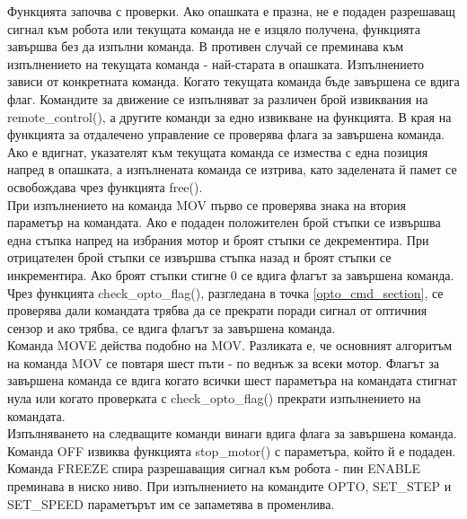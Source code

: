 Функцията започва с проверки. Ако опашката е празна, не е подаден разрешаващ сигнал към робота или текущата команда не е изцяло получена, функцията завършва без да изпълни команда. В противен случай се преминава към изпълнението на текущата команда - най-старата в опашката. Изпълнението зависи от конкретната команда. Когато текущата команда бъде завършена се вдига флаг. Командите за движение се изпълняват за различен брой извиквания на remote\_control(), а другите команди за едно извикване на функцията. В края на функцията за отдалечено управление се проверява флага за завършена команда. Ако е вдигнат, указателят към текущата команда се измества с една позиция напред в опашката, а изпълнената команда се изтрива, като заделената й памет се освобождава чрез функцията free().\\
\indent{}
При изпълнението на команда MOV първо се проверява знака на втория параметър на командата. Ако е подаден положителен брой стъпки се извършва една стъпка напред на избрания мотор и броят стъпки се декрементира. При отрицателен брой стъпки се извършва стъпка назад и броят стъпки се инкрементира. Ако броят стъпки стигне 0 се вдига флагът за завършена команда. Чрез функцията check\_opto\_flag(), разгледана в точка \ref{opto_cmd_section}, се проверява дали командата трябва да се прекрати поради сигнал от оптичния сензор и ако трябва, се вдига флагът за завършена команда.\\
\indent{}
Команда MOVE действа подобно на MOV. Разликата е, че основният алгоритъм на команда MOV се повтаря шест пъти - по веднъж за всеки мотор. Флагът за завършена команда се вдига когато всички шест параметъра на командата стигнат нула или когато проверката с check\_opto\_flag() прекрати изпълнението на командата.\\
\indent{}
Изпълняването на следващите команди винаги вдига флага за завършена команда. Команда OFF извиква функцията stop\_motor() с параметъра, който й е подаден. Команда FREEZE спира разрешаващия сигнал към робота - пин ENABLE преминава в ниско ниво. При изпълнението на командите OPTO, SET\_STEP и SET\_SPEED параметърът им се запаметява в променлива.
